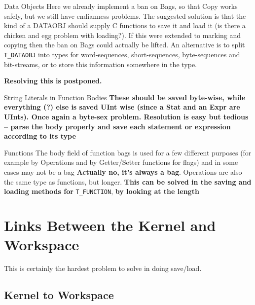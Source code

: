 \documentclass[11pt]{article}
\begin{document}
\begin{description}
\item{Data  Objects} Here we already implement a ban on Bags,
so that Copy works safely, but we still have endianness problems. The
suggested solution is that the kind of a DATAOBJ should supply C
functions to save it and load it (is there a chicken and egg problem
with loading?). If this were extended to marking and copying then the
ban on Bags could actually be lifted. An alternative is to split
\verb|T_DATAOBJ| into types for word-sequences, short-sequences,
byte-sequences and bit-streams, or to store this information somewhere in
the type.

\textbf{Resolving this is postponed.}

\item{String Literals in Function Bodies} \textbf{These should be
saved byte-wise, while everything (?) else is saved UInt wise (since a
Stat and an Expr are UInts). Once again a byte-sex problem. Resolution
is easy but tedious -- parse the body properly and save each statement
or expression according to its type}

\item{Functions} The body field of function bags is used for a few
different purposes (for example by Operations and by Getter/Setter
functions for flags) and in some cases may not be a bag
\textbf{Actually no, it's always a bag}. Operations are also the same
type as functions, but longer. \textbf{This can be solved in the
saving and loading methods for} \verb|T_FUNCTION|, \textbf{by looking
at the length}
\end{description}

\section{Links Between the Kernel and Workspace}

This is certainly the hardest problem to solve in doing save/load.

\subsection{Kernel to Workspace}
\end{document}
